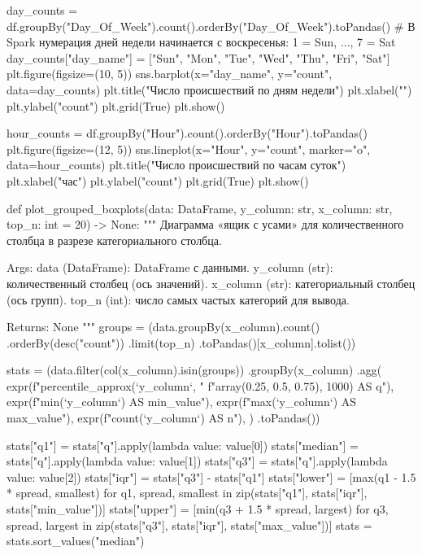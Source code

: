 \begin{code}
day_counts = df.groupBy("Day_Of_Week").count().orderBy("Day_Of_Week").toPandas()
# В Spark нумерация дней недели начинается с воскресенья: 1 = Sun, ..., 7 = Sat
day_counts["day_name"] = ["Sun", "Mon", "Tue", "Wed", "Thu", "Fri", "Sat"]
plt.figure(figsize=(10, 5))
sns.barplot(x="day_name", y="count", data=day_counts)
plt.title("Число происшествий по дням недели")
plt.xlabel("")
plt.ylabel("count")
plt.grid(True)
plt.show()

hour_counts = df.groupBy("Hour").count().orderBy("Hour").toPandas()
plt.figure(figsize=(12, 5))
sns.lineplot(x="Hour", y="count", marker="o", data=hour_counts)
plt.title("Число происшествий по часам суток")
plt.xlabel("час")
plt.ylabel("count")
plt.grid(True)
plt.show()

def plot_grouped_boxplots(data: DataFrame,
                          y_column: str,
                          x_column: str,
                          top_n: int = 20) -> None:
    """
    Диаграмма «ящик с усами» для количественного столбца в разрезе
    категориального столбца.

    Args:
        data (DataFrame): DataFrame с данными.
        y_column (str): количественный столбец (ось значений).
        x_column (str): категориальный столбец (ось групп).
        top_n (int): число самых частых категорий для вывода.

    Returns:
        None
    """
    groups = (data.groupBy(x_column).count()
              .orderBy(desc("count"))
              .limit(top_n)
              .toPandas()[x_column].tolist())

    stats = (data.filter(col(x_column).isin(groups))
             .groupBy(x_column)
             .agg(
                 expr(f"percentile_approx(`{y_column}`, "
                      f"array(0.25, 0.5, 0.75), 1000) AS q"),
                 expr(f"min(`{y_column}`) AS min_value"),
                 expr(f"max(`{y_column}`) AS max_value"),
                 expr(f"count(`{y_column}`) AS n"),
             )
             .toPandas())

    stats["q1"] = stats["q"].apply(lambda value: value[0])
    stats["median"] = stats["q"].apply(lambda value: value[1])
    stats["q3"] = stats["q"].apply(lambda value: value[2])
    stats["iqr"] = stats["q3"] - stats["q1"]
    stats["lower"] = [max(q1 - 1.5 * spread, smallest)
                      for q1, spread, smallest in
                      zip(stats["q1"], stats["iqr"], stats["min_value"])]
    stats["upper"] = [min(q3 + 1.5 * spread, largest)
                     for q3, spread, largest in
                     zip(stats["q3"], stats["iqr"], stats["max_value"])]
    stats = stats.sort_values("median")


\end{code}

